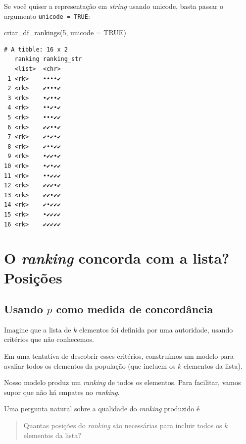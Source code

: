 \documentclass[
  letterpaper,
  DIV=11,
  numbers=noendperiod]{scrreprt}
\newenvironment{Shaded}{\begin{snugshade}}{\end{snugshade}}
\newcommand{\AttributeTok}[1]{\textcolor[rgb]{0.40,0.45,0.13}{#1}}
\newcommand{\ConstantTok}[1]{\textcolor[rgb]{0.56,0.35,0.01}{#1}}
\newcommand{\DecValTok}[1]{\textcolor[rgb]{0.68,0.00,0.00}{#1}}
\newcommand{\FunctionTok}[1]{\textcolor[rgb]{0.28,0.35,0.67}{#1}}
\newcommand{\NormalTok}[1]{\textcolor[rgb]{0.00,0.23,0.31}{#1}}
\begin{document}
Se você quiser a representação em \emph{string} usando unicode, basta
passar o argumento \texttt{unicode\ =\ TRUE}:

\begin{Shaded}
\begin{Highlighting}[]
\FunctionTok{criar\_df\_rankings}\NormalTok{(}\DecValTok{5}\NormalTok{, }\AttributeTok{unicode =} \ConstantTok{TRUE}\NormalTok{)}
\end{Highlighting}
\end{Shaded}

\begin{verbatim}
# A tibble: 16 x 2
   ranking ranking_str
   <list>  <chr>      
 1 <rk>    ••••✔      
 2 <rk>    ✔•••✔      
 3 <rk>    •✔••✔      
 4 <rk>    ••✔•✔      
 5 <rk>    •••✔✔      
 6 <rk>    ✔✔••✔      
 7 <rk>    ✔•✔•✔      
 8 <rk>    ✔••✔✔      
 9 <rk>    •✔✔•✔      
10 <rk>    •✔•✔✔      
11 <rk>    ••✔✔✔      
12 <rk>    ✔✔✔•✔      
13 <rk>    ✔✔•✔✔      
14 <rk>    ✔•✔✔✔      
15 <rk>    •✔✔✔✔      
16 <rk>    ✔✔✔✔✔      
\end{verbatim}


\chapter{\texorpdfstring{O \emph{ranking} concorda com a lista?
Posições}{O ranking concorda com a lista? Posições}}\label{o-ranking-concorda-com-a-lista-posiuxe7uxf5es}

\section{\texorpdfstring{Usando $p$ como medida de
concordância}{Usando  como medida de concordância}}\label{usando-p}

Imagine que a lista de $k$ elementos foi definida por uma autoridade,
usando critérios que não conhecemos.

Em uma tentativa de descobrir esses critérios, construímos um modelo
para avaliar todos os elementos da população (que incluem os $k$
elementos da lista).

Nosso modelo produz um \emph{ranking} de todos os elementos. Para
facilitar, vamos supor que não há empates no \emph{ranking}.

Uma pergunta natural sobre a qualidade do \emph{ranking} produzido é

\begin{quote}
Quantas posições do \emph{ranking} são necessárias para incluir todos os
$k$ elementos da lista?
\end{quote}
\end{document}
